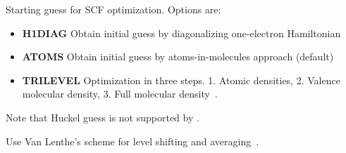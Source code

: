 \begin{description}
Starting guess for SCF optimization. Options are:
\begin{itemize}
\item {\bf H1DIAG} Obtain initial guess by diagonalizing one-electron Hamiltonian
\item {\bf ATOMS}  Obtain initial guess by atoms-in-molecules approach (default)
\item {\bf TRILEVEL} Optimization in three steps. 1. Atomic densities, 2. Valence molecular density, 3. Full molecular density~\cite{trilevel1, trilevel2}. 
\end{itemize}
Note that Huckel guess is not supported by \lsdalton.
\item[\Key{VanLenthe}] Use Van Lenthe's scheme for level shifting and averaging~\cite{VanLenthe}.


\end{description}
